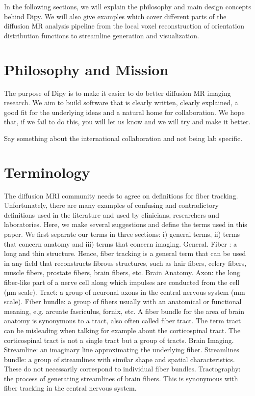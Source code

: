 \documentclass{bioinfo}
\begin{document}
In the following sections, we will explain the philosophy and main design concepts behind Dipy. We will also give examples which cover different parts of the diffusion MR analysis pipeline from the local voxel reconstruction of orientation distribution functions to streamline generation and visualization. 

\section{Philosophy and Mission}

The purpose of Dipy is to make it easier to do better diffusion MR imaging research. We aim to build software that is clearly written, clearly explained, a good fit for the underlying ideas and a natural home for collaboration. We hope that, if we fail to do this, you will let us know and we will try and make it better.

Say something about the international collaboration and not being lab specific.

\section{Terminology}

The diffusion MRI community needs to agree on definitions for fiber tracking. Unfortunately,
there are many examples of confusing and contradictory definitions used in the literature and used
by clinicians, researchers and laboratories. Here, we make several suggestions and define the terms
used in this paper. We first separate our terms in three sections: i) general terms, ii) terms that
concern anatomy and iii) terms that concern imaging.
General. Fiber : a long and thin structure. Hence, fiber tracking is a general term that can be
used in any field that reconstructs fibrous structures, such as hair fibers, celery fibers, muscle fibers,
prostate fibers, brain fibers, etc.
Brain Anatomy. Axon: the long fiber-like part of a nerve cell along which impulses are conducted
from the cell (µm scale). Tract: a group of neuronal axons in the central nervous system (mm
scale). Fiber bundle: a group of ﬁbers usually with an anatomical or functional meaning, e.g.
arcuate fasciculus, fornix, etc. A fiber bundle for the area of brain anatomy is synonymous to a
tract, also often called fiber tract. The term tract can be misleading when talking for example about
the corticospinal tract. The corticospinal tract is not a single tract but a group of tracts.
Brain Imaging. Streamline: an imaginary line approximating the underlying fiber. Streamlines bundle: a group of streamlines with similar shape and spatial characteristics. These do not necessarily
correspond to individual ﬁber bundles. Tractography: the process of generating streamlines of brain
fibers. This is synonymous with fiber tracking in the central nervous system.
\end{document}
